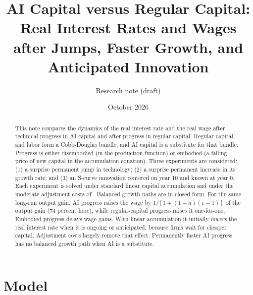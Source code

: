 \documentclass[11pt]{article}
\title{AI Capital versus Regular Capital:\\
Real Interest Rates and Wages after Jumps, Faster Growth, and Anticipated Innovation}
\author{Research note (draft)}
\date{October 2026}
\newcommand{\e}{\varepsilon}
\begin{document}
\maketitle

\begin{abstract}
\noindent This note compares the dynamics of the real interest rate and the real wage
after technical progress in AI capital and after progress in regular capital. Regular
capital and labor form a Cobb-Douglas bundle, and AI capital is a substitute for that
bundle. Progress is either disembodied (in the production function) or embodied (a
falling price of new capital in the accumulation equation). Three experiments are
considered: (1) a surprise permanent jump in technology; (2) a surprise permanent
increase in its growth rate; and (3) an S-curve innovation centered on year 10 and
known at year 0. Each experiment is solved under standard linear capital accumulation
and under the moderate adjustment costs of \citet{kiley2004}. Balanced growth paths
are in closed form. For the same long-run output gain, AI progress raises the wage by
$1/[1+(1-a)(\e-1)]$ of the output gain (74 percent here), while regular-capital progress
raises it one-for-one. Embodied progress delays wage gains. With linear accumulation it
initially \emph{lowers} the real interest rate when it is ongoing or anticipated,
because firms wait for cheaper capital. Adjustment costs largely remove that effect.
Permanently faster AI progress has no balanced growth path when AI is a substitute.
\end{abstract}

\section{Model}
\end{document}
